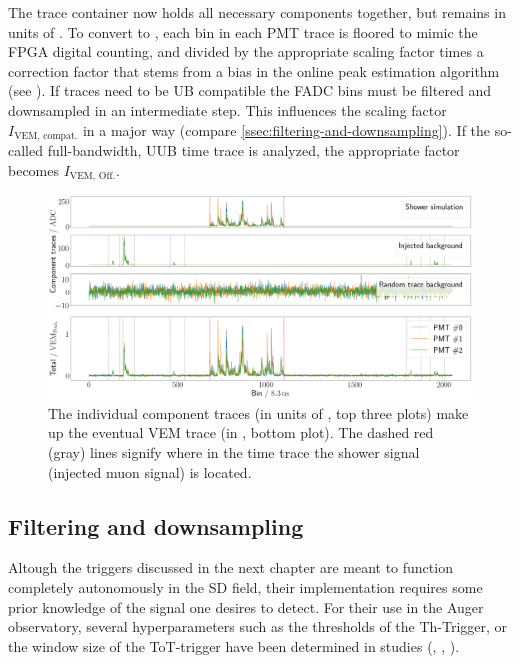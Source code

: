 The trace container now holds all necessary components together, but remains in units of \SI{}{\ADC}. To convert to \SI{}{\Peak}, each bin in each PMT trace is 
floored to mimic the FPGA digital counting, and divided by the appropriate scaling factor \Ipeak times a correction factor that stems from a bias in the online 
peak estimation algorithm (see \cite{bertou2006calibration}). If traces need to be UB compatible the FADC bins must be filtered and downsampled in an intermediate 
step. This influences the scaling factor $I_\text{VEM, compat.}$ in a major way (compare \autoref{ssec:filtering-and-downsampling}). If the so-called 
full-bandwidth, UUB time trace is analyzed, the appropriate factor becomes $I_\text{VEM, Off.}$.

\begin{figure}
	\centering
	\includegraphics[width=\textwidth]{./plots/component_adding.png}
	\caption{The individual component traces (in units of \SI{}{\ADC}, top three plots) make up the eventual VEM trace (in \SI{}{\Peak}, bottom plot). The dashed 
    red (gray) lines signify where in the time trace the shower signal (injected muon signal) is located.}
	\label{fig:component_adding}
\end{figure}

\subsection{Filtering and downsampling}
\label{ssec:filtering-and-downsampling}

Altough the triggers discussed in the next chapter are meant to function completely autonomously in the SD field, their implementation requires some prior 
knowledge of the signal one desires to detect. For their use in the Auger observatory, several hyperparameters such as the thresholds of the Th-Trigger, or the 
window size of the ToT-trigger have been determined in studies (\cite{bertou2006calibration}, \cite{triggerSettings}, \cite{ToTtriggerSetting}). 


